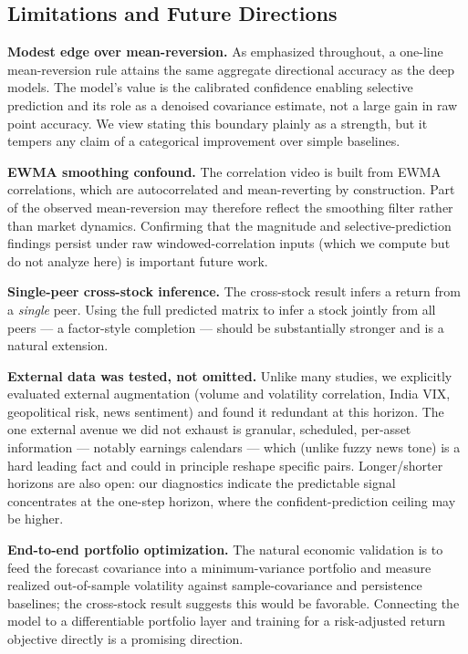 \documentclass[runningheads]{llncs}
\begin{document}
\subsection{Limitations and Future Directions}

\textbf{Modest edge over mean-reversion.} As emphasized throughout, a
one-line mean-reversion rule attains the same aggregate directional
accuracy as the deep models. The model's value is the calibrated
confidence enabling selective prediction and its role as a denoised
covariance estimate, not a large gain in raw point accuracy. We view
stating this boundary plainly as a strength, but it tempers any claim
of a categorical improvement over simple baselines.

\textbf{EWMA smoothing confound.} The correlation video is built from
EWMA correlations, which are autocorrelated and mean-reverting by
construction. Part of the observed mean-reversion may therefore reflect
the smoothing filter rather than market dynamics. Confirming that the
magnitude and selective-prediction findings persist under raw
windowed-correlation inputs (which we compute but do not analyze here)
is important future work.

\textbf{Single-peer cross-stock inference.} The cross-stock result
infers a return from a \emph{single} peer. Using the full predicted
matrix to infer a stock jointly from all peers --- a factor-style
completion --- should be substantially stronger and is a natural
extension.

\textbf{External data was tested, not omitted.} Unlike many studies, we
explicitly evaluated external augmentation (volume and volatility
correlation, India VIX, geopolitical risk, news sentiment) and found it
redundant at this horizon. The one external avenue we did not exhaust is
granular, scheduled, per-asset information --- notably earnings calendars
--- which (unlike fuzzy news tone) is a hard leading fact and could in
principle reshape specific pairs. Longer/shorter horizons are also open:
our diagnostics indicate the predictable signal concentrates at the
one-step horizon, where the confident-prediction ceiling may be higher.

\textbf{End-to-end portfolio optimization.} The natural economic
validation is to feed the forecast covariance into a minimum-variance
portfolio and measure realized out-of-sample volatility against
sample-covariance and persistence baselines; the cross-stock result
suggests this would be favorable. Connecting the model to a
differentiable portfolio layer and training for a risk-adjusted return
objective directly is a promising direction.
\end{document}

